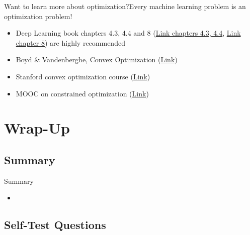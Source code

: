 \begin{frame}{Want to learn more about optimization?}{Every machine learning problem is an optimization problem!}
\begin{itemize}
\item Deep Learning book chapters 4.3, 4.4 and 8 (\href{https://www.deeplearningbook.org/contents/numerical.html}{Link chapters 4.3, 4.4}, \href{https://www.deeplearningbook.org/contents/optimization.html}{Link chapter 8}) are highly recommended
\item Boyd \& Vandenberghe, Convex Optimization (\href{http://web.stanford.edu/~boyd/cvxbook/bv_cvxbook.pdf}{Link})
\item Stanford convex optimization course (\href{https://web.stanford.edu/class/ee364a/lectures.html}{Link})
\item MOOC on constrained optimization (\href{https://www.khanacademy.org/math/multivariable-calculus/applications-of-multivariable-derivatives/lagrange-multipliers-and-constrained-optimization/v/constrained-optimization-introduction}{Link})
\end{itemize}
\end{frame}


\section{Wrap-Up}

\subsection{Summary}

\begin{frame}{Summary}{}
	\begin{itemize}
		\item
	\end{itemize}
\end{frame}


\subsection{Self-Test Questions}

